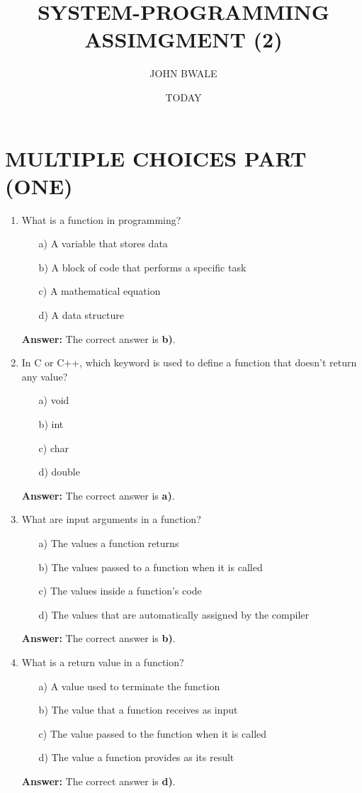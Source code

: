 \documentclass{article}
\author{JOHN BWALE}
\title{SYSTEM-PROGRAMMING ASSIMGMENT (2)}
\date{TODAY}
\begin{document}
\maketitle
\section*{MULTIPLE CHOICES PART (ONE)}

\begin{enumerate}
    \item What is a function in programming?
    \begin{enumerate}
        \item[a)] A variable that stores data
        \item[b)] A block of code that performs a specific task
        \item[c)] A mathematical equation
        \item[d)] A data structure
    \end{enumerate}
    \textbf{Answer:} The correct answer is \textbf{b)}.

    \item In C or C++, which keyword is used to define a function that doesn't return any value?
    \begin{enumerate}
        \item[a)] void
        \item[b)] int
        \item[c)] char
        \item[d)] double
    \end{enumerate}
    \textbf{Answer:} The correct answer is \textbf{a)}.

    \item What are input arguments in a function?
    \begin{enumerate}
        \item[a)] The values a function returns
        \item[b)] The values passed to a function when it is called
        \item[c)] The values inside a function's code
        \item[d)] The values that are automatically assigned by the compiler
    \end{enumerate}
    \textbf{Answer:} The correct answer is \textbf{b)}.

    \item What is a return value in a function?
    \begin{enumerate}
        \item[a)] A value used to terminate the function
        \item[b)] The value that a function receives as input
        \item[c)] The value passed to the function when it is called
        \item[d)] The value a function provides as its result
    \end{enumerate}
    \textbf{Answer:} The correct answer is \textbf{d)}.


\end{enumerate}
\end{document}
